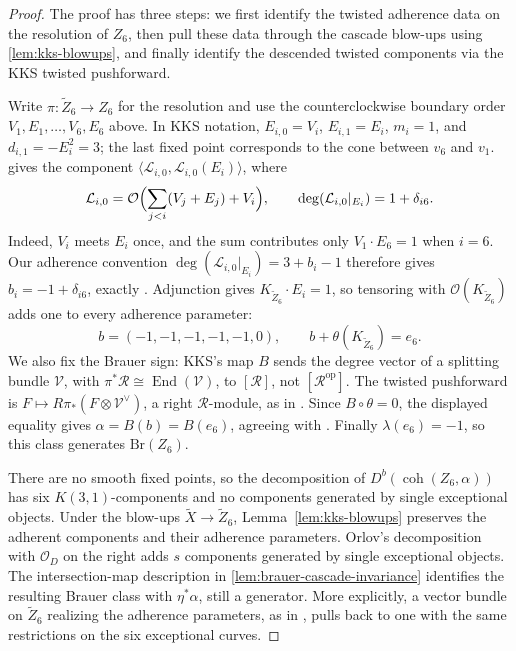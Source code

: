 \documentclass[11pt]{article}
\theoremstyle{plain}
\theoremstyle{definition}
\theoremstyle{remark}
\newcommand{\Db}{D^b}
\newcommand{\coh}{\operatorname{coh}}
\newcommand{\Br}{\mathrm{Br}}
\newcommand{\OO}{\mathcal O}
\begin{document}
\begin{proof}
The proof has three steps: we first identify the twisted adherence data on the
resolution of \(Z_6\), then pull these data through the cascade blow-ups using
\cref{lem:kks-blowups}, and finally identify the descended twisted components
via the KKS twisted pushforward.

Write \(\pi:\widetilde Z_6\to Z_6\) for the resolution and use
the counterclockwise boundary order \(V_1,E_1,\ldots,V_6,E_6\)
above. In KKS notation, \(E_{i,0}=V_i\), \(E_{i,1}=E_i\),
\(m_i=1\), and \(d_{i,1}=-E_i^2=3\); the last fixed point
corresponds to the cone between \(v_6\) and \(v_1\).
\cite[Proposition~5.6, equations~(5.4)--(5.6), p.~510]{KKS2020}
gives the component
\(\langle\mathcal L_{i,0},\mathcal L_{i,0}(E_i)\rangle\), where
\[
\mathcal L_{i,0}=\OO\Bigl(\sum_{j<i}(V_j+E_j)+V_i\Bigr),
\qquad
\deg(\mathcal L_{i,0}|_{E_i})=1+\delta_{i6}.
\]
Indeed, \(V_i\) meets \(E_i\) once, and the sum contributes only
\(V_1\cdot E_6=1\) when \(i=6\). Our adherence convention
\(\deg(\mathcal L_{i,0}|_{E_i})=3+b_i-1\) therefore gives
\(b_i=-1+\delta_{i6}\), exactly
\cite[Proposition~5.6, equation~(5.7)]{KKS2020}.
Adjunction gives \(K_{\widetilde Z_6}\cdot E_i=1\), so tensoring
with \(\OO(K_{\widetilde Z_6})\) adds one to every adherence parameter:
\[
b=(-1,-1,-1,-1,-1,0),\qquad
b+\theta(K_{\widetilde Z_6})=e_6.
\]
We also fix the Brauer sign: KKS's map \(B\) sends the degree vector
of a splitting bundle \(\mathcal V\), with
\(\pi^*\mathcal R\cong\operatorname{End}(\mathcal V)\), to
\([\mathcal R]\), not \([\mathcal R^{\mathrm{op}}]\).
The twisted pushforward is
\(F\mapsto R\pi_*(F\otimes\mathcal V^\vee)\), a right
\(\mathcal R\)-module, as in
\cite[Proposition~4.9 and equations~(4.13)--(4.14), pp.~498--500]{KKS2020}.
Since \(B\circ\theta=0\), the displayed equality gives
\(\alpha=B(b)=B(e_6)\), agreeing with
\cite[equation~(5.8) and Theorem~5.9]{KKS2020}.
Finally \(\lambda(e_6)=-1\), so this class generates \(\Br(Z_6)\).

There are no smooth fixed points, so the decomposition of
\(\Db(\coh(Z_6,\alpha))\) has six \(K(3,1)\)-components and no components
generated by single exceptional objects. Under the blow-ups
\(\widetilde X\to\widetilde Z_6\),
Lemma~\ref{lem:kks-blowups} preserves the adherent components and their
adherence parameters. Orlov's decomposition with \(\OO_D\) on the right adds
\(s\) components generated by single exceptional objects. The intersection-map description in
\cref{lem:brauer-cascade-invariance} identifies the resulting
Brauer class with \(\eta^*\alpha\), still a generator.
More explicitly, a vector bundle on \(\widetilde Z_6\) realizing
the adherence parameters, as in \cite[Corollary~4.10(1)]{KKS2020}, pulls back to
one with the same restrictions on the six exceptional curves.


\end{proof}
\end{document}
